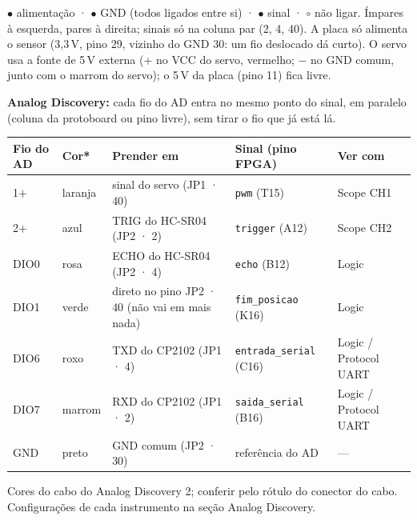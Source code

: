 \documentclass[9pt,a4paper]{extarticle}
\newcommand{\s}[1]{\texttt{#1}}          %
\begin{document}
\textcolor{red!60!black}{$\bullet$} alimentação ·
$\bullet$ GND (todos ligados entre si) ·
\textcolor{blue!60!black}{$\bullet$} sinal · $\circ$ não ligar.
Ímpares à esquerda, pares à direita; sinais só na coluna par (2, 4, 40). A placa só alimenta o sensor (3,3\,V,
pino 29, vizinho do GND 30: um fio deslocado dá curto). O servo usa a fonte
de 5\,V externa ($+$ no VCC do servo, vermelho; $-$ no GND comum, junto com o
marrom do servo); o 5\,V da placa (pino 11) fica livre.

\textbf{Analog Discovery:} cada fio do AD entra no mesmo ponto do sinal, em
paralelo (coluna da protoboard ou pino livre), sem tirar o fio que já está lá.

\begin{tabularx}{\linewidth}{@{}l l Y l l@{}}
\toprule
Fio do AD & Cor* & Prender em & Sinal (pino FPGA) & Ver com \\
$+$  & laranja        & sinal do servo (JP1 · 40)           & \s{pwm} (T15)            & Scope CH1 \\
2$+$  & azul           & TRIG do HC-SR04 (JP2 · 2)           & \s{trigger} (A12)        & Scope CH2 \\
DIO0  & rosa           & ECHO do HC-SR04 (JP2 · 4)           & \s{echo} (B12)           & Logic \\
DIO1  & verde          & direto no pino JP2 · 40 (não vai em mais nada) & \s{fim\_posicao} (K16) & Logic \\
DIO6  & roxo          & TXD do CP2102 (JP1 · 4)             & \s{entrada\_serial} (C16) & Logic / Protocol UART \\
DIO7  & marrom           & RXD do CP2102 (JP1 · 2)             & \s{saida\_serial} (B16)  & Logic / Protocol UART \\
GND   & preto          & GND comum (JP2 · 30)                & referência do AD          & --- \\
\bottomrule
\end{tabularx}

{\footnotesize * Cores do cabo do Analog Discovery 2; conferir pelo rótulo do
conector do cabo. Configurações de cada instrumento na seção Analog Discovery.}
\end{document}

